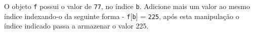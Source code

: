 \documentclass[12pt,varwidth=16cm,border=1pt]{standalone}
\begin{document}
O objeto \verb+f+ possui o valor de \verb+77+, no índice \verb+b+. Adicione mais um valor ao mesmo índice indexando-o da seguinte forma - \verb+f+[\verb+b+] = \verb+225+, após esta manipulação o índice indicado  passa a armazenar o valor 225.

\questiomfalse
\end{document}
